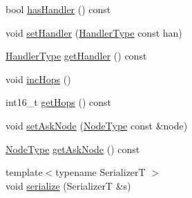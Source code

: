 \begin{DoxyCompactItemize}
\item 
bool \hyperlink{structvt_1_1location_1_1_entity_msg_a0796bd63248dae2b457aa2eedc345743}{has\+Handler} () const
\item 
void \hyperlink{structvt_1_1location_1_1_entity_msg_af3c49e5e6d894d29984bf9ebf3983717}{set\+Handler} (\hyperlink{namespacevt_af64846b57dfcaf104da3ef6967917573}{Handler\+Type} const han)
\item 
\hyperlink{namespacevt_af64846b57dfcaf104da3ef6967917573}{Handler\+Type} \hyperlink{structvt_1_1location_1_1_entity_msg_ab373f1520ac7374900bbea1026372b8e}{get\+Handler} () const
\item 
void \hyperlink{structvt_1_1location_1_1_entity_msg_a2bd45f682dbeb4f6a39ded357483012b}{inc\+Hops} ()
\item 
int16\+\_\+t \hyperlink{structvt_1_1location_1_1_entity_msg_a42198cb01c34983b7c46103cea721b9f}{get\+Hops} () const
\item 
void \hyperlink{structvt_1_1location_1_1_entity_msg_a42166a96c86f14d91cf378ff2e315db6}{set\+Ask\+Node} (\hyperlink{namespacevt_a866da9d0efc19c0a1ce79e9e492f47e2}{Node\+Type} const \&node)
\item 
\hyperlink{namespacevt_a866da9d0efc19c0a1ce79e9e492f47e2}{Node\+Type} \hyperlink{structvt_1_1location_1_1_entity_msg_a5a95c196dd8c41a15988b90bca30a316}{get\+Ask\+Node} () const
\item 
{\footnotesize template$<$typename SerializerT $>$ }\\void \hyperlink{structvt_1_1location_1_1_entity_msg_a203b07e756313743e7258b8b1dbcb527}{serialize} (SerializerT \&s)
\end{DoxyCompactItemize}
